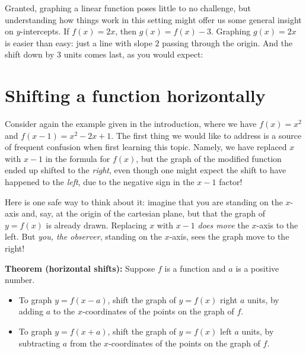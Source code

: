 \documentclass{ximera}
\begin{document}
\begin{example}
\begin{enumerate}[label=\alph*.]
\begin{explanation}
      Granted, graphing a linear function poses little to no challenge, but understanding how things work in this setting might offer us some general insight on $y$-intercepts. If $f(x) = 2x$, then $g(x) = f(x)-3$. Graphing $g(x) = 2x$ is easier than easy: just a line with slope $2$ passing through the origin. And the shift down by $3$ units comes last, as you would expect:
            \begin{image}
      \end{image}
    \end{explanation}
  \end{enumerate}
\end{example}


\section{Shifting a function horizontally}

Consider again the example given in the introduction, where we have $f(x) = x^2$ and $f(x-1) = x^2-2x+1$. The first thing we would like to address is a source of frequent confusion when first learning this topic. Namely, we have replaced $x$ with $x-1$ in the formula for $f(x)$, but the graph of the modified function ended up shifted to the \emph{right}, even though one might expect the shift to have happened to the \emph{left}, due to the negative sign in the $x-1$ factor!

Here is one safe way to think about it: imagine that you are standing on the $x$-axis and, say, at the origin of the cartesian plane, but that the graph of $y=f(x)$ is already drawn. Replacing $x$ with $x-1$ \emph{does move} the $x$-axis to the left. But \emph{you, the observer}, standing on the $x$-axis, sees the graph move to the right!


\begin{callout}
  {\bf Theorem (horizontal shifts):} Suppose $f$ is a function and $a$ is a positive number.
  \begin{itemize}
  \item To graph $y = f(x-a)$, shift the graph of $y=f(x)$ right $a$ units, by adding $a$ to the $x$-coordinates of the points on the graph of $f$.
      \item To graph $y = f(x+a)$, shift the graph of $y=f(x)$ left $a$ units, by subtracting $a$ from the $x$-coordinates of the points on the graph of $f$.
  \end{itemize}
\end{callout}
\end{document}
